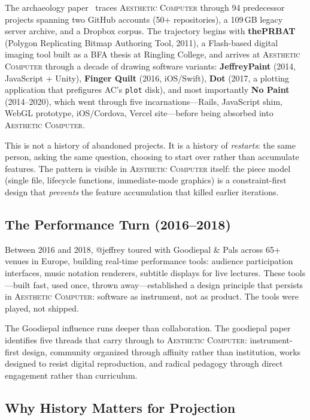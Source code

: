 \documentclass[10pt,letterpaper,twocolumn]{article}
\newcommand{\ac}{\textsc{Aesthetic Computer}}
\begin{document}
The archaeology paper~\citep{scudder2026archaeology} traces \ac{} through 94 predecessor projects spanning two GitHub accounts (50+ repositories), a 109\,GB legacy server archive, and a Dropbox corpus. The trajectory begins with \textbf{thePRBAT} (Polygon Replicating Bitmap Authoring Tool, 2011), a Flash-based digital imaging tool built as a BFA thesis at Ringling College, and arrives at \ac{} through a decade of drawing software variants: \textbf{JeffreyPaint} (2014, JavaScript + Unity), \textbf{Finger Quilt} (2016, iOS/Swift), \textbf{Dot} (2017, a plotting application that prefigures AC's \texttt{plot} disk), and most importantly \textbf{No Paint} (2014--2020), which went through five incarnations---Rails, JavaScript shim, WebGL prototype, iOS/Cordova, Vercel site---before being absorbed into \ac{}.

This is not a history of abandoned projects. It is a history of \emph{restarts}: the same person, asking the same question, choosing to start over rather than accumulate features. The pattern is visible in \ac{} itself: the piece model (single file, lifecycle functions, immediate-mode graphics) is a constraint-first design that \emph{prevents} the feature accumulation that killed earlier iterations.

\subsection{The Performance Turn (2016--2018)}

Between 2016 and 2018, @jeffrey toured with Goodiepal \& Pals across 65+ venues in Europe, building real-time performance tools: audience participation interfaces, music notation renderers, subtitle displays for live lectures. These tools---built fast, used once, thrown away---established a design principle that persists in \ac{}: software as instrument, not as product. The tools were played, not shipped.

The Goodiepal influence runs deeper than collaboration. The goodiepal paper~\citep{scudder2026goodiepal} identifies five threads that carry through to \ac{}: instrument-first design, community organized through affinity rather than institution, works designed to resist digital reproduction, and radical pedagogy through direct engagement rather than curriculum.

\subsection{Why History Matters for Projection}
\end{document}

